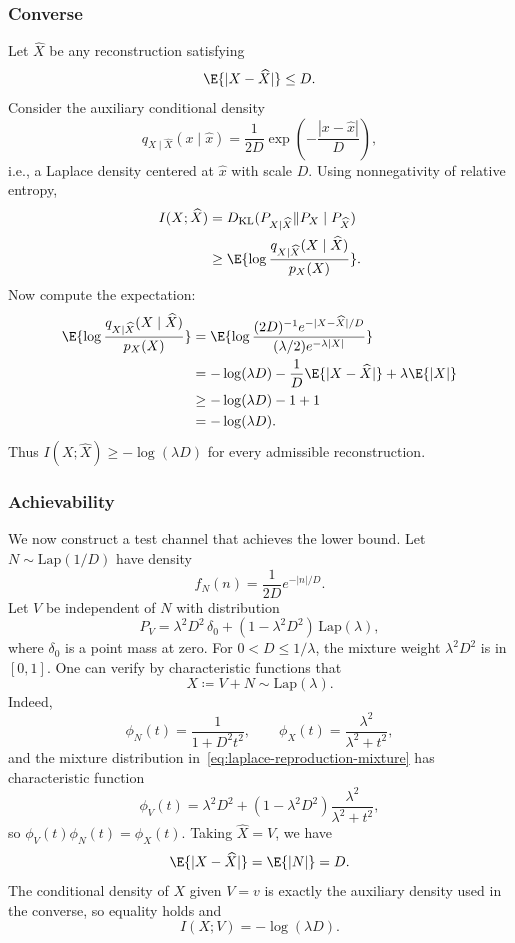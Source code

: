 \subsubsection*{Converse}

Let $\widehat X$ be any reconstruction satisfying
\[
    \E{|X-\widehat X|}\le D.
\]
Consider the auxiliary conditional density
\begin{equation}
    q_{X\mid \widehat X}(x\mid \hat x)
    =\frac{1}{2D}\exp\left(-\frac{|x-\hat x|}{D}\right),
\end{equation}
i.e., a Laplace density centered at $\hat x$ with scale $D$.
Using nonnegativity of relative entropy,
\begin{align}
I(X;\widehat X)
&=D_{\mathrm{KL}}(P_{X\mid \widehat X}\|P_X\mid P_{\widehat X}) \\
&\ge
\E{\log\frac{q_{X\mid \widehat X}(X\mid \widehat X)}{p_X(X)}}.
\end{align}
Now compute the expectation:
\begin{align}
\E{\log\frac{q_{X\mid \widehat X}(X\mid \widehat X)}{p_X(X)}}
&=
\E{\log\frac{(2D)^{-1}e^{-|X-\widehat X|/D}}{(\lambda/2)e^{-\lambda |X|}}} \\
&= -\log(\lambda D)-\frac{1}{D}\E{|X-\widehat X|}+\lambda\E{|X|} \\
&\ge -\log(\lambda D)-1+1 \\
&= -\log(\lambda D).
\end{align}
Thus $I(X;\widehat X)\ge -\log(\lambda D)$ for every admissible reconstruction.

\subsubsection*{Achievability}

We now construct a test channel that achieves the lower bound.
Let $N\sim\mathrm{Lap}(1/D)$ have density
\[
    f_N(n)=\frac{1}{2D}e^{-|n|/D}.
\]
Let $V$ be independent of $N$ with distribution
\begin{equation}
    P_V
    =\lambda^2D^2\,\delta_0
    +(1-\lambda^2D^2)\,\mathrm{Lap}(\lambda),
    \label{eq:laplace-reproduction-mixture}
\end{equation}
where $\delta_0$ is a point mass at zero.
For $0<D\le 1/\lambda$, the mixture weight $\lambda^2D^2$ is in $[0,1]$.
One can verify by characteristic functions that
\begin{equation}
    X\coloneqq V+N \sim \mathrm{Lap}(\lambda).
\end{equation}
Indeed,
\[
\phi_N(t)=\frac{1}{1+D^2t^2},
\qquad
\phi_X(t)=\frac{\lambda^2}{\lambda^2+t^2},
\]
and the mixture distribution in~\eqref{eq:laplace-reproduction-mixture} has characteristic function
\[
\phi_V(t)=\lambda^2D^2+(1-\lambda^2D^2)\frac{\lambda^2}{\lambda^2+t^2},
\]
so $\phi_V(t)\phi_N(t)=\phi_X(t)$.
Taking $\widehat X=V$, we have
\[
    \E{|X-\widehat X|}=\E{|N|}=D.
\]
The conditional density of $X$ given $V=v$ is exactly the auxiliary density used in the converse, so equality holds and
\[
    I(X;V)=-\log(\lambda D).
\]

